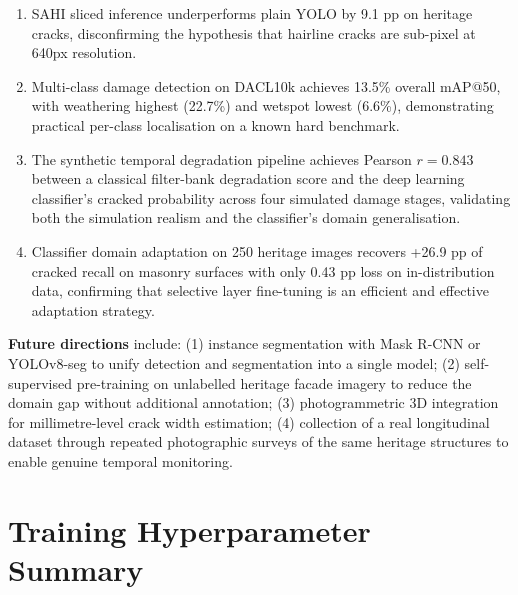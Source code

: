 \documentclass[12pt,a4paper]{article}
\begin{document}
\begin{enumerate}[leftmargin=1.5cm, resume]
\item SAHI sliced inference underperforms plain YOLO by 9.1 pp on heritage cracks, disconfirming the hypothesis that hairline cracks are sub-pixel at 640px resolution.

\item Multi-class damage detection on DACL10k achieves 13.5\% overall mAP@50, with weathering highest (22.7\%) and wetspot lowest (6.6\%), demonstrating practical per-class localisation on a known hard benchmark.

\item The synthetic temporal degradation pipeline achieves Pearson $r = 0.843$ between a classical filter-bank degradation score and the deep learning classifier's cracked probability across four simulated damage stages, validating both the simulation realism and the classifier's domain generalisation.

\item Classifier domain adaptation on 250 heritage images recovers +26.9 pp of cracked recall on masonry surfaces with only 0.43 pp loss on in-distribution data, confirming that selective layer fine-tuning is an efficient and effective adaptation strategy.
\end{enumerate}

\textbf{Future directions} include: (1) instance segmentation with Mask R-CNN or YOLOv8-seg to unify detection and segmentation into a single model; (2) self-supervised pre-training on unlabelled heritage facade imagery to reduce the domain gap without additional annotation; (3) photogrammetric 3D integration for millimetre-level crack width estimation; (4) collection of a real longitudinal dataset through repeated photographic surveys of the same heritage structures to enable genuine temporal monitoring.

\clearpage
\appendix
\section{Training Hyperparameter Summary}
\end{document}
